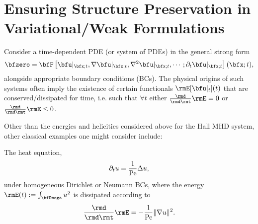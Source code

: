 \section{Ensuring Structure Preservation in Variational/Weak Formulations}

    Consider a time-dependent PDE (or system of PDEs) in the general strong form
    \begin{equation}\label{eqn:general time-dependent PDE}
        \bfzero  =  \bfF\left[\bfu|_{\bfx; t}, \nabla\bfu|_{\bfx; t}, \nabla^{2}\bfu|_{\bfx; t}, \cdots; \partial_{t}\bfu|_{\bfx; t}\right](\bfx; t),
    \end{equation}
    alongside appropriate boundary conditions (BCs). The physical origins of such systems often imply the existence of certain functionals $\rmE[\bfu|_{t}](t)$ that are conserved/dissipated for time, i.e. such that $\forall  t$ either $\frac{\rmd}{\rmd\rmt}\rmE  =  0$ or $\frac{\rmd}{\rmd\rmt}\rmE  \leq  0$.
    
    \line
    
    Other than the energies and helicities considered above for the Hall MHD system, other classical examples one might consider include:
    \begin{example}
        The heat equation,
        \begin{equation}\label{eqn:heat equation}
            \partial_{t}u  =  \frac{1}{\mathrm{Pe}}\Delta u,
        \end{equation}
        under homogeneous Dirichlet or Neumann BCs, where the energy $\rmE(t)  :=  \int_{\bfOmega}u^{2}$ is dissipated according to
        \begin{equation}\label{eqn:heat equation dissipation}
            \frac{\rmd}{\rmd\rmt}\rmE  =  - \frac{1}{\rmPe}\|\nabla u\|^{2}.
        \end{equation}
    \end{example}
    
